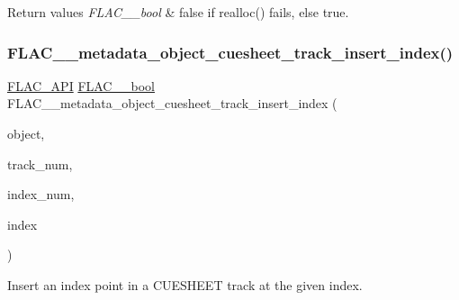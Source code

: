 \begin{DoxyRetVals}{Return values}
{\em F\+L\+A\+C\+\_\+\+\_\+bool} & {\ttfamily false} if realloc() fails, else {\ttfamily true}. \\
\hline
\end{DoxyRetVals}
\mbox{\label{group__flac__metadata__object_ga2f8c5d80c409eff5ebd53ccd0c6f0984}} 
\subsubsection{\texorpdfstring{F\+L\+A\+C\+\_\+\+\_\+metadata\+\_\+object\+\_\+cuesheet\+\_\+track\+\_\+insert\+\_\+index()}{FLAC\_\_metadata\_object\_cuesheet\_track\_insert\_index()}}
{\footnotesize\ttfamily \hyperlink{group__flac__export_ga56ca07df8a23310707732b1c0007d6f5}{F\+L\+A\+C\+\_\+\+A\+PI} \hyperlink{ordinals_8h_a95103469f1cbd78b8cf250194985b34e}{F\+L\+A\+C\+\_\+\+\_\+bool} F\+L\+A\+C\+\_\+\+\_\+metadata\+\_\+object\+\_\+cuesheet\+\_\+track\+\_\+insert\+\_\+index (\begin{DoxyParamCaption}\item[{\hyperlink{struct_f_l_a_c_____stream_metadata}{F\+L\+A\+C\+\_\+\+\_\+\+Stream\+Metadata} $\ast$}]{object,  }\item[{unsigned}]{track\+\_\+num,  }\item[{unsigned}]{index\+\_\+num,  }\item[{\hyperlink{struct_f_l_a_c_____stream_metadata___cue_sheet___index}{F\+L\+A\+C\+\_\+\+\_\+\+Stream\+Metadata\+\_\+\+Cue\+Sheet\+\_\+\+Index}}]{index }\end{DoxyParamCaption})}

Insert an index point in a C\+U\+E\+S\+H\+E\+ET track at the given index.


